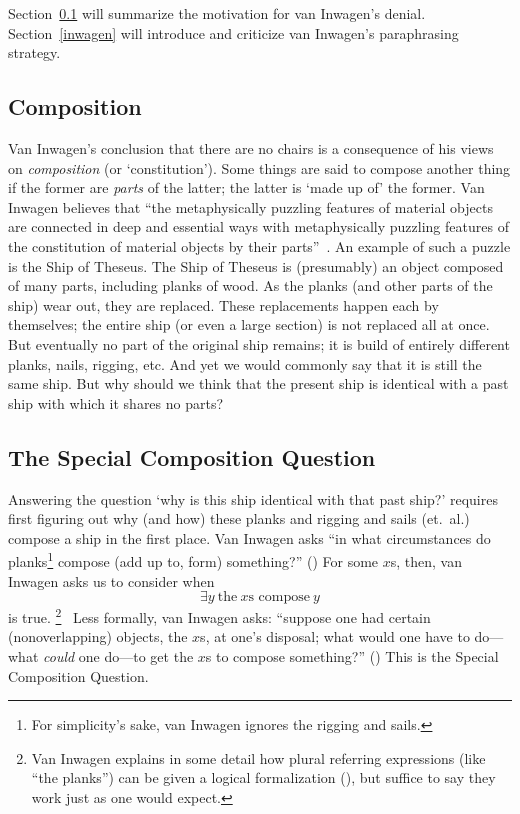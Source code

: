 \documentclass[11pt]{article}
\begin{document}
\begin{spacing}{1.5}
Section~\ref{comp} will summarize the motivation for van Inwagen's
denial.  Section~\ref{inwagen} will introduce and criticize van
Inwagen's paraphrasing strategy.

\subsection{Composition}
\label{comp}
Van Inwagen's conclusion that there are no chairs is a consequence of
his views on {\em composition} (or `constitution').  Some things are
said to compose another thing if the former are {\em parts} of the
latter; the latter is `made up of' the former.  Van Inwagen believes
that ``the metaphysically puzzling features of material objects are
connected in deep and essential ways with metaphysically puzzling
features of the constitution of material objects by their
parts''~\citep[18]{inwagen1995}.  An example of such a puzzle is the
Ship of Theseus.  The Ship of Theseus is (presumably) an object
composed of many parts, including planks of wood.  As the planks (and
other parts of the ship) wear out, they are replaced.  These
replacements happen each by themselves; the entire ship (or even a
large section) is not replaced all at once.  But eventually no part of
the original ship remains; it is build of entirely different planks,
nails, rigging, etc.  And yet we would commonly say that it is still
the same ship.  But why should we think that the present ship is
identical with a past ship with which it shares no parts?

\subsection{The Special Composition Question}
\label{scq}
Answering the question `why is this ship identical with that past
ship?' requires first figuring out why (and how) these planks and
rigging and sails (et.\ al.) compose a ship in the first place.  Van
Inwagen asks ``in what circumstances do planks\footnote{For
  simplicity's sake, van Inwagen ignores the rigging and sails.}
compose (add up to, form) something?'' (\citeyear[21]{inwagen1995}) 
For some $x$s, then, van Inwagen asks us to consider when
\begin{equation}
\exists y\ \text{the}\ x\text{s compose}\ y
\end{equation}
is true.%
\footnote{Van Inwagen explains in some detail how plural referring
  expressions (like ``the planks'') can be given a logical
  formalization (\citeyear[23--28]{inwagen1995}), but suffice to say
  they work just as one would expect.}
%
\ Less formally, van Inwagen asks: ``suppose one had certain
(nonoverlapping) objects, the $x$s, at one's disposal; what would one
have to do---what {\em could} one do---to get the $x$s to compose
something?'' (\citeyear[31]{inwagen1995})  This is the Special
Composition Question.


\end{spacing}
\end{document}
